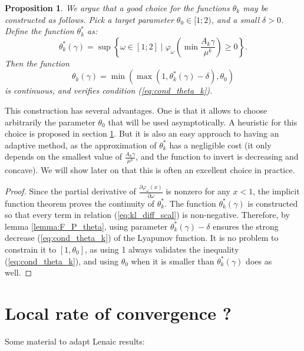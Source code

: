 \documentclass{article} %
\theoremstyle{plain}
\newtheorem{proposition}{Proposition}
\theoremstyle{definition}
\theoremstyle{remark}
\begin{document}
\begin{proposition}
	We argue that a good choice for the functions $\theta_k$ may be constructed as follows. Pick a target parameter $\theta_0 \in [1;2)$, and a small $\delta>0$.
	Define the function $\theta_k^*$ as:
	\begin{equation}
	\theta_k^*(\gamma) = \sup \left\{\omega \in [1;2]  \mid \varphi_\omega\left(\min \frac{A_k \gamma}{\mu^k}\right) \ge 0 \right\} .
	\end{equation}
	Then the function
	\begin{equation}
	\label{eq:theta_k}
	\theta_k(\gamma) = \min(\max(1,\theta_k^*(\gamma)-\delta),\theta_0)
	\end{equation}
	is continuous, and verifies condition (\ref{eq:cond_theta_k}).
\end{proposition}
This construction has several advantages.
One is that it allows to choose arbitrarily the parameter $\theta_0$ that will be used asymptotically. A heuristic for this choice is proposed in section \ref{section:local}.
But it is also an easy approach to having an adaptive method, as the approximation of $\theta_k^*$ has a negligible cost (it only depends on the smallest value of $\frac{A_k \gamma}{\mu^k}$, and the function to invert is decreasing and concave).
We will show later on that this is often an excellent choice in practice.
\begin{proof}
	Since the partial derivative of $\frac{\partial\varphi_\omega(x)}{\partial\omega}$ is nonzero for any $x<1$, the implicit function theorem proves the continuity of $\theta_k^*$.
	The function $\theta_k^*(\gamma)$ is constructed so that every term in relation (\ref{eq:kl_diff_scal}) is non-negative.
	Therefore, by lemma \ref{lemma:F_P_theta}, using parameter $\theta_k^*(\gamma)-\delta$ ensures the strong decrease (\ref{eq:cond_theta_k}) of the Lyapunov function.
	It is no problem to constrain it to $[1,\theta_0]$, as using 1 always validates the inequality (\ref{eq:cond_theta_k}), and using $\theta_0$ when it is smaller than $\theta_k^*(\gamma)$ does as well.
\end{proof}

\section{Local rate of convergence ?}
\label{section:local}
Some material to adapt Lenaic results:
\end{document}
